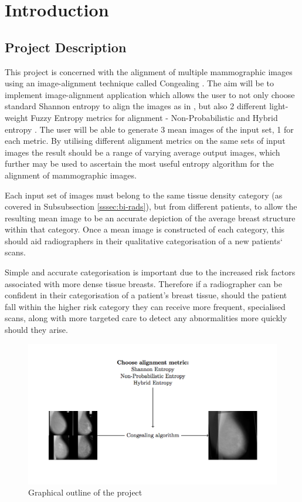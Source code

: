 \chapter{Introduction}

\section{Project Description}
This project is concerned with the alignment of multiple mammographic images using an image-alignment technique called \Gls{Congealing} \cite{joint-alignment}. The aim will be to implement image-alignment application which allows the user to not only choose standard Shannon entropy to align the images as in \cite{joint-alignment}, but also 2 different light-weight Fuzzy Entropy metrics for alignment - Non-Probabilistic \cite{DeLuca_Termini_1972} and Hybrid entropy \cite{Pal_Pal_1992}. The user will be able to generate 3 mean images of the input set, 1 for each metric. By utilising different alignment metrics on the same sets of input images the result should be a range of varying average output images, which further may be used to ascertain the most useful entropy algorithm for the alignment of mammographic images.

Each input set of images must belong to the same tissue density category (as covered in Subsubsection \ref{sssec:bi-rads}), but from different patients, to allow the resulting mean image to be an accurate depiction of the average breast structure within that category. Once a mean image is constructed of each category, this should aid radiographers in their qualitative categorisation of a new patients` scans.

Simple and accurate categorisation is important due to the increased risk factors associated with more dense tissue breasts. Therefore if a radiographer can be confident in their categorisation of a patient's breast tissue, should the patient fall within the higher risk category they can receive more frequent, specialised scans, along with more targeted care to detect any abnormalities more quickly should they arise.

\begin{figure}[H]
  \center
    \includegraphics{Introduction/diagram/diagram.png}
    \caption{Graphical outline of the project}
    \label{fig:project-desc-img}
\end{figure}



